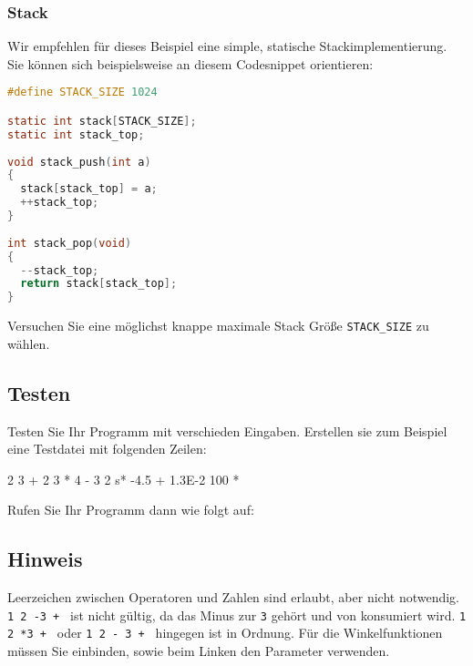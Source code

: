 \subsubsection*{Stack}
Wir empfehlen f{\"u}r dieses Beispiel eine simple, statische Stackimplementierung.
Sie k{\"o}nnen sich beispielsweise an diesem Codesnippet orientieren:
\begin{lstlisting}[language=c,basicstyle=\scriptsize]
#define STACK_SIZE 1024

static int stack[STACK_SIZE];
static int stack_top;
 
void stack_push(int a)
{
  stack[stack_top] = a;
  ++stack_top;
}
  
int stack_pop(void)
{
  --stack_top;
  return stack[stack_top];
}
\end{lstlisting}
Versuchen Sie eine m{\"o}glichst knappe maximale Stack Gr{\"o}{\ss}e \verb|STACK_SIZE| zu w{\"a}hlen.

\subsection*{Testen}
Testen Sie Ihr Programm mit verschieden Eingaben. Erstellen sie zum Beispiel
eine Testdatei  mit folgenden Zeilen:

\begin{osuefmtcode}
  2 3 +
  2 3 * 4 -
  3 2 s* -4.5 +
  1.3E-2 100 *
\end{osuefmtcode}

Rufen Sie Ihr Programm dann wie folgt auf:


\subsection*{Hinweis}
Leerzeichen zwischen Operatoren und Zahlen sind erlaubt, aber nicht notwendig. \verb|1 2 -3 + | ist nicht gültig, da das Minus zur \verb|3| gehört und von  konsumiert wird. \verb|1 2 *3 + | oder \verb|1 2 - 3 + | hingegen ist in Ordnung.
Für die Winkelfunktionen müssen Sie  einbinden, sowie beim Linken den Parameter  verwenden.

\osueguidelinesone


